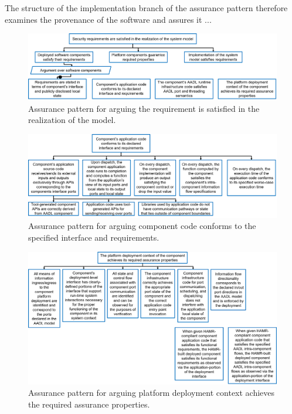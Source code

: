 The structure of the implementation branch of the assurance pattern therefore examines the provenance of the software and assures it ...

\begin{figure}[h] 
	\centering 
	\includegraphics[width=\textwidth]{figs/req-satisfied-in-model-realization.png}
	\caption{Assurance pattern for arguing the requirement is satisfied in the realization of the model.}
	\label{fig:req-satisfied-in-model-realization} 
\end{figure}



\begin{figure}[h]
	\centering 
	\includegraphics[width=\textwidth]{figs/code-conforms-to-interface-and-requirements.png}
	\caption{Assurance pattern for arguing component code conforms to the specified interface and requirements.}
	\label{fig:code-conforms-to-interface-and-requirements} 
\end{figure}


\begin{figure}[h] 
	\centering 
	\includegraphics[width=\textwidth]{figs/platform-deployment-context-achieves-assurance-properties.png}
	\caption{Assurance pattern for arguing platform deployment context achieves the required assurance properties.}
	\label{fig:platform-deployment-context-achieves-assurance-properties} 
\end{figure}